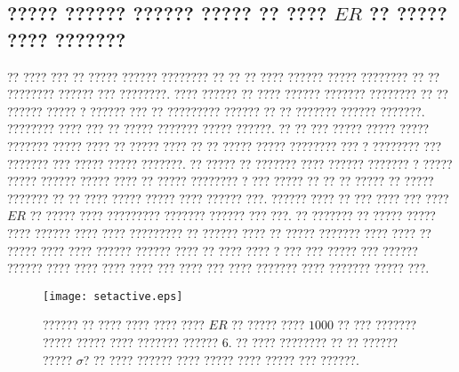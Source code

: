 \subsection{????? ?????? ?????? ????? ?? ???? $ER$ ?? ????? ???? ???????}
?? ???? ??? ?? ????? ?????? ???????? ?? ?? ?? ???? ?????? ????? ???????? ?? ?? ???????? ?????? ??? ????????. ???? ?????? ?? ???? ?????? ??????? ???????? ?? ?? ?????? ?????  ? ?????? ??? ?? ????????? ?????? ?? ?? ??????? ?????? ???????. ???????? ???? ??? ?? ????? ??????? ????? ??????. ?? ?? ??? ????? ????? ????? ??????? ????? ???? ?? ????? ???? ?? ?? ????? ????? ???????? ??? ? ???????? ??? ??????? ??? ????? ????? ???????. ?? ????? ?? ??????? ???? ?????? ??????? ? ????? ????? ?????? ????? ???? ?? ????? ???????? ? ??? ????? ?? ?? ?? ????? ?? ????? ??????? ?? ?? ???? ????? ????? ???? ?????? ???. ?????? ???? ?? ??? ???? ??? ????$ER$ ?? ????? ???? ????????? ??????? ?????? ??? ???. 
?? ??????? ?? ????? ????? ???? ?????? ???? ???? ????????? ?? ?????? ???? ?? ????? ??????? ???? ???? ?? ????? ???? ???? ?????? ?????? ???? ?? ???? ???? ? ??? ??? ????? ??? ?????? ?????? ???? ???? ???? ???? ??? ???? ??? ???? ??????? ???? ??????? ????? ???.

 
\begin{figure}[htbp]
\hspace*{0cm}
\centering
\texttt{[image: setactive.eps]}\centering
\caption [????? ?????? ?? ?????? ?? ???????? ???? ???? ???? $ER$ ?? ?????? ?????]{\footnotesize ?????? ?? ???? ???? ???? ???? $ER$ ?? ????? ????  $1000$  ?? ??? ??????? ????? ????? ???? ??????? ?????? $6$. ?? ???? ???????? ?? ?? ?????? ????? $\sigma$? ?? ???? ?????? ???? ????? ???? ????? ??? ??????.}
\label{fig:ER}
\end{figure}

